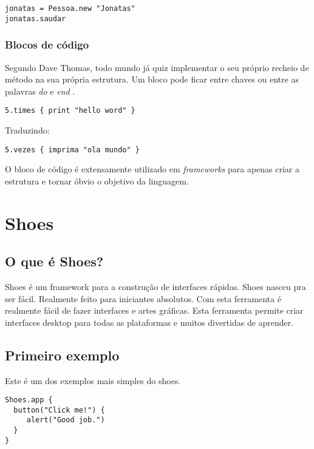 \documentclass[espaco=simples,appendix=Name]{abnt}
\begin{document}
\begin{lstlisting}[caption=Exemplo de utilização da classe descrita acima ]
jonatas = Pessoa.new "Jonatas"
jonatas.saudar 
\end{lstlisting}

\subsection { Blocos de código }

\cite{programmingRuby}
Segundo Dave Thomas, todo mundo já quiz implementar o seu próprio recheio de método na sua própria estrutura. Um bloco pode ficar entre chaves ou entre as palavras \textit{ do } e \textit{ end }.

\begin{lstlisting}[caption=Exemplo de bloco de código ]
   5.times { print "hello word" }
\end{lstlisting}

Traduzindo: 
\begin{lstlisting}[caption=Exemplo de bloco de código ]
   5.vezes { imprima "ola mundo" }
\end{lstlisting}

O bloco de código é extensamente utilizado em \textit{frameworks} para apenas criar a estrutura e tornar óbvio o objetivo da linguagem.


\chapter{ Shoes }

\section{O que é Shoes?}

Shoes é um framework para a construção de interfaces rápidas. Shoes nasceu pra ser fácil. Realmente feito para iniciantes absolutos. Com esta ferramenta é realmente fácil de fazer interfaces e artes gráficas. 
Esta ferramenta permite criar interfaces desktop para todas as plataformas e muitos divertidas de aprender.

\section{ Primeiro exemplo }

Este é um dos exemplos mais simples do shoes. 

\begin{lstlisting}[caption=Primeiro exemplo do framework Shoes  ]
Shoes.app { 
  button("Click me!") {
     alert("Good job.") 
  }
} 
\end{lstlisting}
\end{document}
